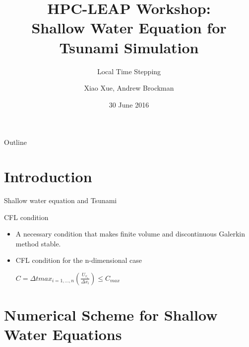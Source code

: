 \documentclass{beamer}
\title[Local Time Stepping]{HPC-LEAP Workshop:\\ Shallow Water Equation for Tsunami Simulation}
\subtitle{Local Time Stepping}
\author[Xiao Xue, Andrew Brockman]{Xiao Xue, Andrew Brockman}  %
\institute[]{HPC-LEAP Marie Curie Action}
\date{30 June 2016}
\begin{document}
\begin{frame}
  \titlepage
\end{frame}

\begin{frame}{Outline}
  \tableofcontents
\end{frame}

\section{Introduction}
\begin{frame}[t]{Shallow water equation and Tsunami}
  \begin{block}{CFL condition}
        \begin{itemize}
            \item A \alert{necessary} condition that makes finite volume and discontinuous Galerkin method stable.
            \item CFL condition for the n-dimensional case\\
            \begin{center}
            	$C = \Delta t max_{i=1,...,n}(\frac{U_{x_{i}}}{\Delta x_{i}})\leq C_{max}$
            \end{center}
        \end{itemize}
    \end{block}

\end{frame}

\section{Numerical Scheme for Shallow Water Equations}
\end{document}
